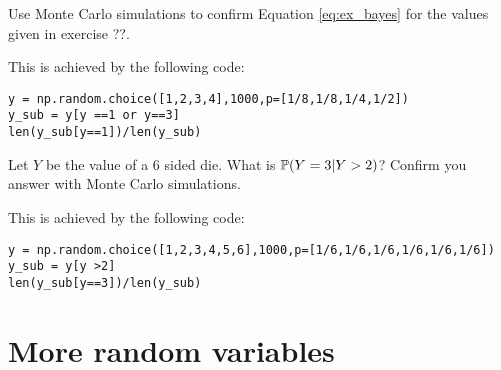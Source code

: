 \begin{example}
Use Monte Carlo simulations to confirm Equation  \eqref{eq:ex_bayes} for the values given in exercise ??. 
\end{example}

\begin{solution}
This is achieved by the following code: 
\begin{Verbatim}
y = np.random.choice([1,2,3,4],1000,p=[1/8,1/8,1/4,1/2])
y_sub = y[y ==1 or y==3]
len(y_sub[y==1])/len(y_sub)
\end{Verbatim}
\end{solution}

\begin{exercise}
Let $Y$ be the value of a 6 sided die. What is $\mathbb P(Y=3|Y>2)$? Confirm you answer with Monte Carlo simulations. 
\end{exercise}

\begin{solution}
This is achieved by the following code: 
\begin{Verbatim}
y = np.random.choice([1,2,3,4,5,6],1000,p=[1/6,1/6,1/6,1/6,1/6,1/6])
y_sub = y[y >2]
len(y_sub[y==3])/len(y_sub)
\end{Verbatim}
\end{solution}









\section{More random variables}

